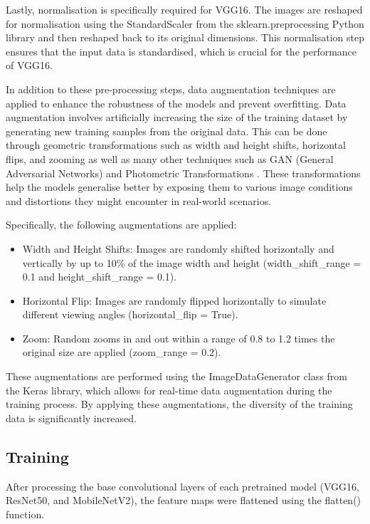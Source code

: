 Lastly, normalisation is specifically required for VGG16. The images are reshaped for normalisation using the StandardScaler from the sklearn.preprocessing Python library and then reshaped back to its original dimensions. This normalisation step ensures that the input data is standardised, which is crucial for the performance of VGG16.

In addition to these pre-processing steps, data augmentation techniques are applied to enhance the robustness of the models and prevent overfitting. Data augmentation involves artificially increasing the size of the training dataset by generating new training samples from the original data. This can be done through geometric transformations such as width and height shifts, horizontal flips, and zooming as well as many other techniques such as GAN (General Adversarial Networks) and Photometric Transformations \cite{Shorten2019-mj}. These transformations help the models generalise better by exposing them to various image conditions and distortions they might encounter in real-world scenarios.

Specifically, the following augmentations are applied:

\begin{itemize}
\item{} Width and Height Shifts: Images are randomly shifted horizontally and vertically by up to 10\% of the image width and height (width\_shift\_range = 0.1 and height\_shift\_range = 0.1).
\item{} Horizontal Flip: Images are randomly flipped horizontally to simulate different viewing angles (horizontal\_flip = True).
\item{} Zoom: Random zooms in and out within a range of 0.8 to 1.2 times the original size are applied (zoom\_range = 0.2).
\end{itemize}

These augmentations are performed using the ImageDataGenerator class from the Keras library, which allows for real-time data augmentation during the training process. By applying these augmentations, the diversity of the training data is significantly increased.

\subsection{Training}

After processing the base convolutional layers of each pretrained model (VGG16, ResNet50, and MobileNetV2), the feature maps were flattened using the flatten() function.

